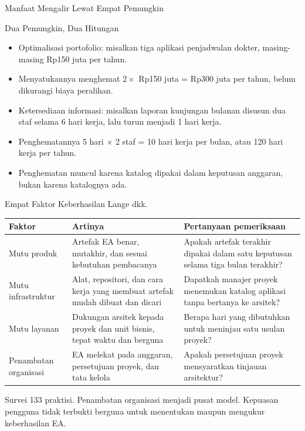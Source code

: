 \documentclass[aspectratio=169, table, 12pt]{beamer}
\begin{document}
\begin{frame}{{\Large Manfaat Mengalir Lewat Empat Pemungkin}}
  \centering
\end{frame}

\begin{frame}{{\Large Dua Pemungkin, Dua Hitungan}}
  \vspace{6pt}
  \small
  \begin{itemize}
    \item Optimalisasi portofolio: misalkan tiga aplikasi penjadwalan dokter, masing-masing Rp150 juta
          per tahun.
    \item Menyatukannya menghemat $2 \times$ Rp150 juta = Rp300 juta per tahun, belum dikurangi biaya
          peralihan.
    \item Ketersediaan informasi: misalkan laporan kunjungan bulanan disusun dua staf selama 6 hari
          kerja, lalu turun menjadi 1 hari kerja.
    \item Penghematannya 5 hari $\times$ 2 staf = 10 hari kerja per bulan, atau 120 hari kerja per
          tahun.
    \item Penghematan muncul karena katalog dipakai dalam keputusan anggaran, bukan karena katalognya
          ada.
  \end{itemize}
\end{frame}

\begin{frame}{{\Large Empat Faktor Keberhasilan Lange dkk.}}
  \scriptsize
  \begin{tabularx}{\textwidth}{>{\raggedright\arraybackslash}p{2.1cm}
      >{\raggedright\arraybackslash}X >{\raggedright\arraybackslash}X}
    \hline
    \textbf{Faktor} & \textbf{Artinya} & \textbf{Pertanyaan pemeriksaan} \\
    \hline
    Mutu produk & Artefak EA benar, mutakhir, dan sesuai kebutuhan pembacanya & Apakah artefak terakhir dipakai dalam satu keputusan selama tiga bulan terakhir? \\
    \hline
    Mutu infrastruktur & Alat, repositori, dan cara kerja yang membuat artefak mudah dibuat dan dicari & Dapatkah manajer proyek menemukan katalog aplikasi tanpa bertanya ke arsitek? \\
    \hline
    Mutu layanan & Dukungan arsitek kepada proyek dan unit bisnis, tepat waktu dan berguna & Berapa hari yang dibutuhkan untuk meninjau satu usulan proyek? \\
    \hline
    Penambatan organisasi & EA melekat pada anggaran, persetujuan proyek, dan tata kelola & Apakah persetujuan proyek mensyaratkan tinjauan arsitektur? \\
    \hline
  \end{tabularx}

  \vspace{6pt}
  \small Survei 133 praktisi. Penambatan organisasi menjadi pusat model. Kepuasan pengguna tidak
  terbukti berguna untuk menentukan maupun mengukur keberhasilan EA.
\end{frame}
\end{document}
